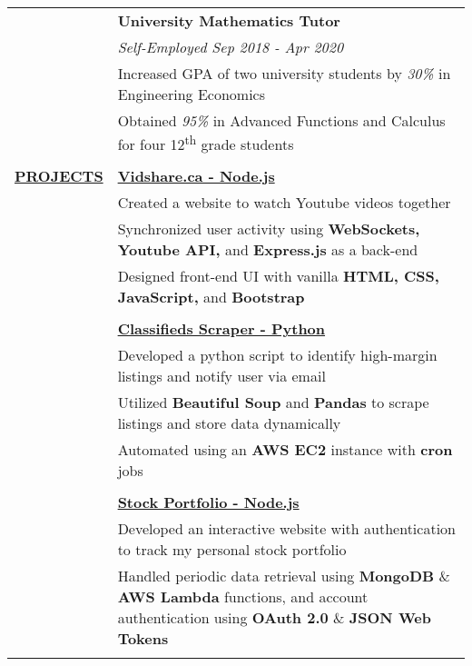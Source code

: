 \documentclass[letterpaper,11pt,oneside]{article}
\newcommand\tabitem{\makebox[1em][r]{-~~}} %
\newcommand\tabspace{\makebox[1em][r]{~~~}} %
\begin{document}
\begin{tabular}{@{}p{1.15in} p{6.08in}@{}}
     & \textbf{University Mathematics Tutor} \\
     & \textit{Self-Employed \hfill Sep 2018 - Apr 2020} \\
     & \tabitem Increased GPA of two university students by \textit{30\%} in Engineering Economics \\
     & \tabitem Obtained \textit{95\%} in Advanced Functions and Calculus for four 12\textsuperscript{th} grade students \\
     & \\
     
  \textbf{\href{https://github.com/nathancheung22}{PROJECTS}} 
     & \textbf{\href{https://github.com/nathancheung22/vidshare}{Vidshare.ca - Node.js}} \\
     & \tabitem Created a website to watch Youtube videos together \\
     & \tabitem Synchronized user activity using \textbf{WebSockets, Youtube API,} and \textbf{Express.js} as a back-end \\
     & \tabitem Designed front-end UI with vanilla \textbf{HTML, CSS, JavaScript,} and \textbf{Bootstrap} \\
     & \\
     
     & \textbf{\href{https://github.com/nathancheung22/classifieds-scraper}{Classifieds Scraper - Python}} \\
     & \tabitem Developed a python script to identify high-margin listings and notify user via email \\
     & \tabitem Utilized \textbf{Beautiful Soup} and \textbf{Pandas} to scrape listings and store data dynamically \\
     & \tabitem Automated using an \textbf{AWS EC2} instance with \textbf{cron} jobs \\
     & \\
     
     & \textbf{\href{https://determined-curie-4250bb.netlify.com/}{Stock Portfolio - Node.js}} \\
     & \tabitem Developed an interactive website with authentication to track my personal stock portfolio \\
     & \tabitem Handled periodic data retrieval using \textbf{MongoDB} \& \textbf{AWS Lambda} functions, and account \tabspace authentication using \textbf{OAuth 2.0} \& \textbf{JSON Web Tokens} \\
     & \\
     

\end{tabular}
\end{document}
